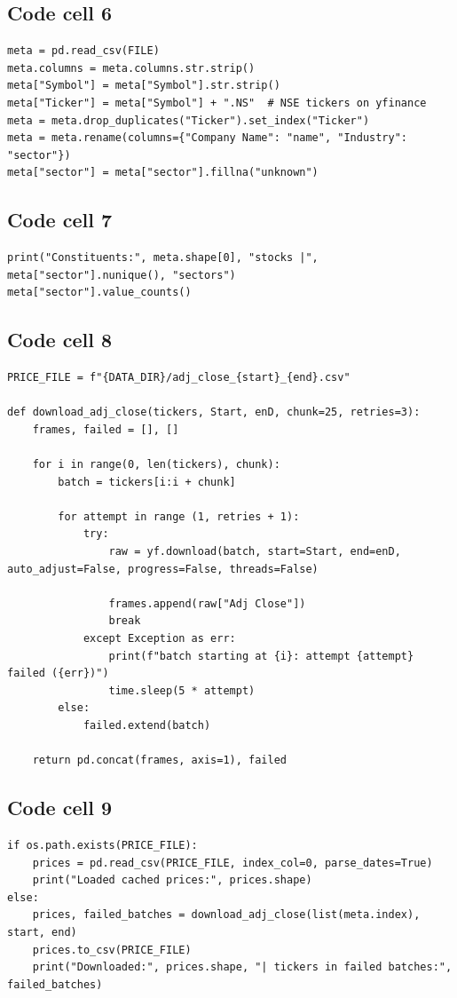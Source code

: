 \documentclass[12pt,a4paper]{report}
\begin{document}
\subsection*{Code cell 6}
\begin{lstlisting}[style=fancy]
meta = pd.read_csv(FILE)
meta.columns = meta.columns.str.strip()
meta["Symbol"] = meta["Symbol"].str.strip()
meta["Ticker"] = meta["Symbol"] + ".NS"  # NSE tickers on yfinance
meta = meta.drop_duplicates("Ticker").set_index("Ticker")
meta = meta.rename(columns={"Company Name": "name", "Industry": "sector"})
meta["sector"] = meta["sector"].fillna("unknown")
\end{lstlisting}

\subsection*{Code cell 7}
\begin{lstlisting}[style=fancy]
print("Constituents:", meta.shape[0], "stocks |", meta["sector"].nunique(), "sectors")
meta["sector"].value_counts()
\end{lstlisting}

\subsection*{Code cell 8}
\begin{lstlisting}[style=fancy]
PRICE_FILE = f"{DATA_DIR}/adj_close_{start}_{end}.csv"

def download_adj_close(tickers, Start, enD, chunk=25, retries=3):
    frames, failed = [], []

    for i in range(0, len(tickers), chunk):
        batch = tickers[i:i + chunk]

        for attempt in range (1, retries + 1):
            try:
                raw = yf.download(batch, start=Start, end=enD, auto_adjust=False, progress=False, threads=False)

                frames.append(raw["Adj Close"])
                break
            except Exception as err:
                print(f"batch starting at {i}: attempt {attempt} failed ({err})")
                time.sleep(5 * attempt)
        else:
            failed.extend(batch)
    
    return pd.concat(frames, axis=1), failed
\end{lstlisting}

\subsection*{Code cell 9}
\begin{lstlisting}[style=fancy]
if os.path.exists(PRICE_FILE):
    prices = pd.read_csv(PRICE_FILE, index_col=0, parse_dates=True)
    print("Loaded cached prices:", prices.shape)
else:
    prices, failed_batches = download_adj_close(list(meta.index), start, end)
    prices.to_csv(PRICE_FILE)
    print("Downloaded:", prices.shape, "| tickers in failed batches:", failed_batches)
\end{lstlisting}
\end{document}
